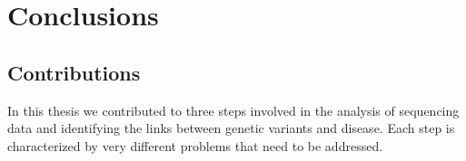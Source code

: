 
\chapter{Conclusions \label{ch:concl}}

\section{Contributions}

In this thesis we contributed to three steps involved in the analysis of sequencing data and identifying the links between genetic variants and disease. Each step is characterized by very different problems that need to be addressed.
					
